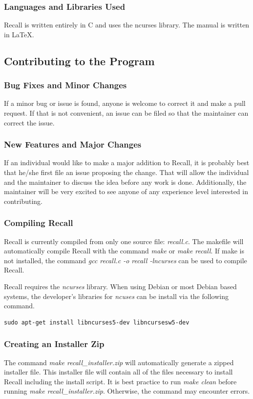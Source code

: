 \documentclass[letterpaper]{article}
\begin{document}
\subsubsection{Languages and Libraries Used}
Recall is written entirely in C and uses the ncurses library. The manual is written in \LaTeX.

\subsection{Contributing to the Program}
\subsubsection{Bug Fixes and Minor Changes}
If a minor bug or issue is found, anyone is welcome to correct it and make a pull request. If that is not convenient, an issue can be filed so that the maintainer can correct the issue.

\subsubsection{New Features and Major Changes}
If an individual would like to make a major addition to Recall, it is probably best that he/she first file an issue proposing the change. That will allow the individual and the maintainer to discuss the idea before any work is done. Additionally, the maintainer will be very excited to see anyone of any experience level interested in contributing.

\subsubsection{Compiling Recall}
Recall is currently compiled from only one source file: \textit{recall.c}. The makefile will automatically compile Recall with the command \textit{make} or \textit{make recall}. If make is not installed, the command \textit{gcc recall.c -o recall -lncurses} can be used to compile Recall.

Recall requires the \textit{ncurses} library. When using Debian or most Debian based systems, the developer's libraries for \textit{ncuses} can be install via the following command.
\begin{verbatim}
sudo apt-get install libncurses5-dev libncursesw5-dev
\end{verbatim}

\subsubsection{Creating an Installer Zip}
The command \textit{make recall\_installer.zip} will automatically generate a zipped installer file. This installer file will contain all of the files necessary to install Recall including the install script. It is best practice to run \textit{make clean} before running \textit{make recall\_installer.zip}. Otherwise, the command may encounter errors.
\end{document}
